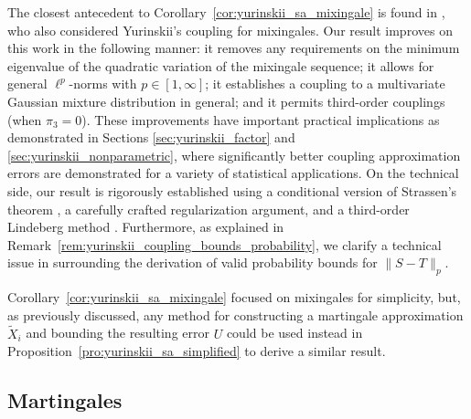 \documentclass[11pt,lof]{puthesis}
\theoremstyle{break}
\theoremstyle{proof}
\begin{document}
The closest antecedent to Corollary~\ref{cor:yurinskii_sa_mixingale} is found in
\citet[Theorem~4]{li2020uniform}, who also considered Yurinskii's coupling for
mixingales. Our result improves on this work in the following manner: it
removes any requirements on the minimum eigenvalue of the quadratic variation
of the mixingale sequence; it allows for general $\ell^p$-norms with
$p\in[1,\infty]$; it establishes a coupling to a multivariate Gaussian
mixture distribution in general; and it permits third-order couplings
(when $\pi_3=0$). These improvements have important practical implications as
demonstrated in Sections \ref{sec:yurinskii_factor} and
\ref{sec:yurinskii_nonparametric},
where significantly better coupling approximation
errors are demonstrated for a variety of statistical applications. On the
technical side, our result is rigorously established using a conditional
version of Strassen's theorem \citep{chen2020jackknife}, a carefully crafted
regularization argument, and a third-order Lindeberg method
\citep[see][and references therein, for more discussion on the
standard second-order Lindeberg method]{chatterjee2006generalization}.
Furthermore, as explained in
Remark~\ref{rem:yurinskii_coupling_bounds_probability}, we
clarify a technical issue in \citet{li2020uniform} surrounding the derivation
of valid probability bounds for $\|S-T\|_p$.

Corollary~\ref{cor:yurinskii_sa_mixingale} focused on mixingales for
simplicity, but, as
previously discussed, any method for constructing a martingale approximation
$\tilde X_i$ and bounding the resulting error $U$ could be used instead in
Proposition~\ref{pro:yurinskii_sa_simplified} to derive a similar result.

\subsection{Martingales}
\label{sec:yurinskii_martingales}
\end{document}
